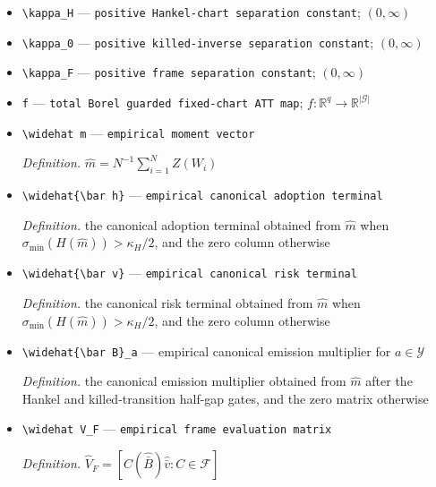 \documentclass{article}
\begin{document}
\begin{itemize}
  \par\smallskip\noindent\emph{Definition.} \(m=\mathbb E_{P_W}[Z(W)]\)
  \item \texttt{\textbackslash{}\allowbreak{}kappa\_\allowbreak{}H} --- \texttt{positive Hankel-\allowbreak{}chart separation constant}; \((0,\infty)\)
  \item \texttt{\textbackslash{}\allowbreak{}kappa\_\allowbreak{}0} --- \texttt{positive killed-\allowbreak{}inverse separation constant}; \((0,\infty)\)
  \item \texttt{\textbackslash{}\allowbreak{}kappa\_\allowbreak{}F} --- \texttt{positive frame separation constant}; \((0,\infty)\)
  \item \texttt{f} --- \texttt{total Borel guarded fixed-\allowbreak{}chart ATT map}; \(f:\mathbb R^q\to\mathbb R^{|\mathcal G|}\)
  \item \texttt{\textbackslash{}\allowbreak{}widehat m} --- \texttt{empirical moment vector}
  \par\smallskip\noindent\emph{Definition.} \(\widehat m=N^{-1}\sum_{i=1}^N Z(W_i)\)
  \item \texttt{\textbackslash{}\allowbreak{}widehat\{\textbackslash{}\allowbreak{}bar h\}\allowbreak{}} --- \texttt{empirical canonical adoption terminal}
  \par\smallskip\noindent\emph{Definition.} the canonical adoption terminal obtained from \(\widehat m\) when \(\sigma_{\min}(H(\widehat m))>\kappa_H/2\), and the zero column otherwise
  \item \texttt{\textbackslash{}\allowbreak{}widehat\{\textbackslash{}\allowbreak{}bar v\}\allowbreak{}} --- \texttt{empirical canonical risk terminal}
  \par\smallskip\noindent\emph{Definition.} the canonical risk terminal obtained from \(\widehat m\) when \(\sigma_{\min}(H(\widehat m))>\kappa_H/2\), and the zero column otherwise
  \item \texttt{\textbackslash{}\allowbreak{}widehat\{\textbackslash{}\allowbreak{}bar B\}\allowbreak{}\_\allowbreak{}a} --- empirical canonical emission multiplier for \(a\in\mathcal Y\)
  \par\smallskip\noindent\emph{Definition.} the canonical emission multiplier obtained from \(\widehat m\) after the Hankel and killed-transition half-gap gates, and the zero matrix otherwise
  \item \texttt{\textbackslash{}\allowbreak{}widehat V\_\allowbreak{}F} --- \texttt{empirical frame evaluation matrix}
  \par\smallskip\noindent\emph{Definition.} \(\widehat V_F=[C(\widehat{\bar B})\widehat{\bar v}:C\in\mathcal F]\)

\end{itemize}
\end{document}
